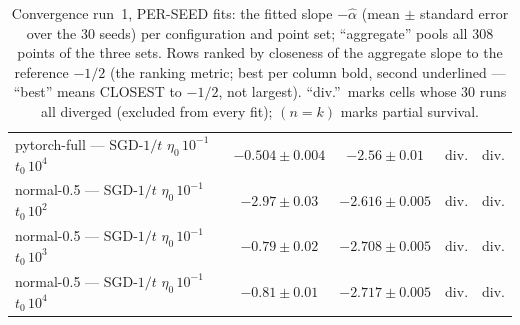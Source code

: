 \begin{table}[H]
\begin{tabular}{@{}>{\raggedright\arraybackslash}p{5.2cm} cccc@{}}
pytorch-full --- SGD-$1/t$ $\eta_0\,10^{-1}$ $t_0\,10^{4}$ & \textbf{$-0.504 \pm 0.004$} & $-2.56 \pm 0.01$ & div. & div. \\
normal-0.5 --- SGD-$1/t$ $\eta_0\,10^{-1}$ $t_0\,10^{2}$ & $-2.97 \pm 0.03$ & $-2.616 \pm 0.005$ & div. & div. \\
normal-0.5 --- SGD-$1/t$ $\eta_0\,10^{-1}$ $t_0\,10^{3}$ & $-0.79 \pm 0.02$ & $-2.708 \pm 0.005$ & div. & div. \\
normal-0.5 --- SGD-$1/t$ $\eta_0\,10^{-1}$ $t_0\,10^{4}$ & $-0.81 \pm 0.01$ & $-2.717 \pm 0.005$ & div. & div. \\
\bottomrule
\end{tabular}
\caption{Convergence run~1, PER-SEED fits: the fitted slope $-\hat\alpha$ (mean $\pm$ standard error over the 30 seeds) per configuration and point set; ``aggregate'' pools all 308 points of the three sets. Rows ranked by closeness of the aggregate slope to the reference $-1/2$ (the ranking metric; best per column bold, second underlined --- ``best'' means CLOSEST to $-1/2$, not largest). ``div.''\ marks cells whose 30 runs all diverged (excluded from every fit); $(n{=}k)$ marks partial survival.}
\label{tab:convergence-run1-slopes-perseed}
\end{table}
